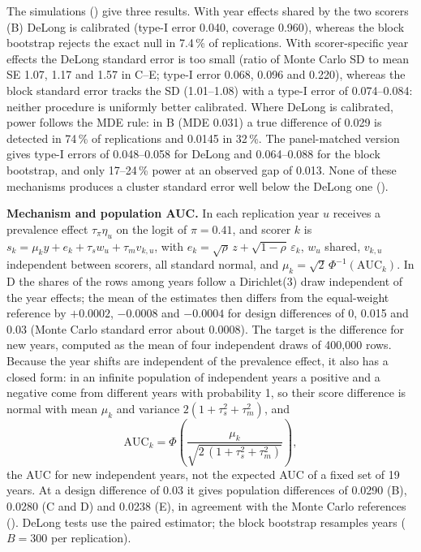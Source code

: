\documentclass[11pt,a4paper]{article}
\begin{document}
The simulations () give three results. With year effects shared by the two scorers (B) DeLong is calibrated (type-I error 0.040, coverage 0.960), whereas the block bootstrap rejects the exact null in 7.4\,\% of replications. With scorer-specific year effects the DeLong standard error is too small (ratio of Monte Carlo SD to mean SE 1.07, 1.17 and 1.57 in C--E; type-I error 0.068, 0.096 and 0.220), whereas the block standard error tracks the SD (1.01--1.08) with a type-I error of 0.074--0.084: neither procedure is uniformly better calibrated. Where DeLong is calibrated, power follows the MDE rule: in B (MDE 0.031) a true difference of 0.029 is detected in 74\,\% of replications and 0.0145 in 32\,\%. The panel-matched version gives type-I errors of 0.048--0.058 for DeLong and 0.064--0.088 for the block bootstrap, and only 17--24\,\% power at an observed gap of 0.013. None of these mechanisms produces a cluster standard error well below the DeLong one ().

\textbf{Mechanism and population AUC.}\label{app:sim_mechanism} In each replication year $u$ receives a prevalence effect $\tau_\pi\eta_u$ on the logit of $\pi=0.41$, and scorer $k$ is $s_k=\mu_k y+e_k+\tau_s w_u+\tau_m v_{k,u}$, with $e_k=\sqrt\rho\,z+\sqrt{1-\rho}\,\varepsilon_k$, $w_u$ shared, $v_{k,u}$ independent between scorers, all standard normal, and $\mu_k=\sqrt2\,\Phi^{-1}(\mathrm{AUC}_k)$. In D the shares of the rows among years follow a Dirichlet(3) draw independent of the year effects; the mean of the estimates then differs from the equal-weight reference by $+0.0002$, $-0.0008$ and $-0.0004$ for design differences of 0, 0.015 and 0.03 (Monte Carlo standard error about 0.0008). The target is the difference for new years, computed as the mean of four independent draws of 400{,}000 rows. Because the year shifts are independent of the prevalence effect, it also has a closed form: in an infinite population of independent years a positive and a negative come from different years with probability 1, so their score difference is normal with mean $\mu_k$ and variance $2(1+\tau_s^2+\tau_m^2)$, and
\begin{equation}
\mathrm{AUC}_k=\Phi\!\left(\frac{\mu_k}{\sqrt{2\,(1+\tau_s^2+\tau_m^2)}}\right),
\end{equation}
the AUC for new independent years, not the expected AUC of a fixed set of 19 years. At a design difference of 0.03 it gives population differences of 0.0290 (B), 0.0280 (C and D) and 0.0238 (E), in agreement with the Monte Carlo references (). DeLong tests use the paired estimator; the block bootstrap resamples years ($B=300$ per replication).
\end{document}
